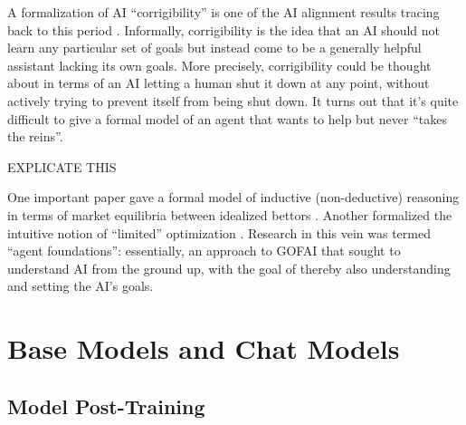 A formalization of AI ``corrigibility'' is one of the AI alignment results
tracing back to this period \cite{soares2015corrigibility}. Informally,
corrigibility is the idea that an AI should not learn any particular set of
goals but instead come to be a generally helpful assistant lacking its own
goals. More precisely, corrigibility could be thought about in terms of an AI
letting a human shut it down at any point, without actively trying to prevent
itself from being shut down. It turns out that it's quite difficult to give a
formal model of an agent that wants to help but never ``takes the reins''.

EXPLICATE THIS

One important paper gave a formal model of inductive (non-deductive) reasoning
in terms of market equilibria between idealized bettors
\cite{garrabrant2020induction}. Another formalized the intuitive notion of
``limited'' optimization \cite{taylor2016quantilizers}. Research in this vein
was termed ``agent foundations'': essentially, an approach to GOFAI that sought
to understand AI from the ground up, with the goal of thereby also
understanding and setting the AI's goals.

\section{Base Models and Chat Models}

\subsection{Model Post-Training}

\cite{askell2021assistant}
\cite{nostalgebraist2025void}


